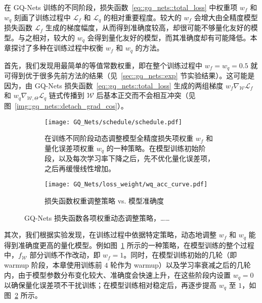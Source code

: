 在 GQ-Nets 训练的不同阶段，损失函数~\eqref{eq::gq_nets::total_loss} 中权重项 $w_f$ 和 $w_q$ 刻画了训练过程中 $\mathcal{L}_f$ 和 $\mathcal{L}_q$ 的相对重要程度。较大的 $w_f$ 会增大由全精度模型损失函数 $\mathcal{L}_f$ 生成的梯度幅度，从而得到准确度较高，却很可能不够量化友好的模型。与之相对，较大的 $w_q$ 会得到量化友好的模型，而其准确度却有可能降低。本章探讨了多种在训练过程中权衡 $w_f$ 和 $w_q$ 的方法。

首先，我们发现用最简单的等值常数权重，即在整个训练过程中 $w_f = w_q = 0.5$ 就可得到优于很多先前方法的结果（见~\ref{sec::gq_nets::exp} 节实验结果）。这可能是因为，由 GQ-Nets 损失函数~\eqref{eq::gq_nets::total_loss} 生成的两组梯度 $w_f \nabla_{\mathcal{W}}\mathcal{L}_f$ 和 $w_q \nabla_{\mathcal{W}, \Theta}\mathcal{L}_q$ 链式传播到 $\mathcal{W}$ 后基本正交而不会相互冲突（见图~\ref{img::gq_nets::detach_grad_cos}）。

\begin{figure}[htb]
  \centering
  \begin{subfigure}[t]{0.45\columnwidth}
    \centering
    \texttt{[image: GQ\_Nets/schedule/schedule.pdf]}
    \caption{在训练不同阶段动态调整模型全精度损失项权重 $w_f$ 和量化误差项权重 $w_q$ 的一种策略。在模型训练初始阶段，以及每次学习率下降之后，先不优化量化误差项，之后再缓慢线性增加。}
    \label{img::gq_nets::w_fq_schedule}
  \end{subfigure}
  \quad
  \begin{subfigure}[t]{0.45\columnwidth}
    \centering
    \texttt{[image: GQ\_Nets/loss\_weight/wq\_acc\_curve.pdf]}
    \caption{损失函数权重调整策略 vs. 模型准确度}
    \label{img::gq_nets::schedule_acc}
  \end{subfigure}
  \caption{GQ-Nets 损失函数各项权重动态调整策略，……}
  \label{img::gq_nets::schedule}
\end{figure}

其次，我们根据实验发现，在训练过程中依据特定策略，动态地调整 $w_f$ 和 $w_q$ 能得到准确度更高的量化模型。例如图~\ref{img::gq_nets::w_fq_schedule} 所示的一种策略，在模型训练的整个过程中，$f_{\mathcal{W}}$ 部分训练不作改动，即 $w_f = 1$。同时，在模型训练初始的几轮（即 warmup 阶段，本章使用训练前 $4$ 轮作为 warmup）以及学习率衰减之后的几轮内，由于模型参数分布变化较大、准确度会快速上升，在这些阶段内设置 $w_q = 0$ 以确保量化误差项不干扰训练；在模型训练相对稳定后，再逐步提高 $w_q$ 至 $1$，如图~\ref{img::gq_nets::schedule_acc} 所示。
